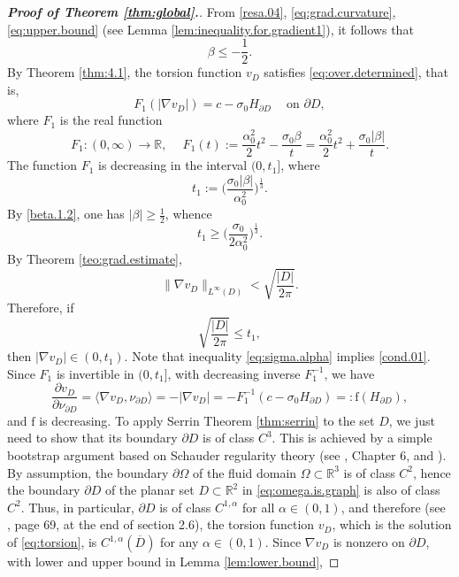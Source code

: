 \documentclass[10pt,reqno,a4paper]{article}
\numberwithin{equation}{section}
\theoremstyle{plain}
\theoremstyle{definition}
\newcommand{\R}{{\mathbb R}}
\newcommand{\s}{\sigma}
\newcommand{\la}{\langle}
\newcommand{\ra}{\rangle}
\newcommand{\pa}{\partial}
\newcommand{\grad}{\nabla}
\begin{document}
\begin{proof}[\textbf{Proof of Theorem \ref{thm:global}.}]
From \eqref{resa.04}, \eqref{eq:grad.curvature}, \eqref{eq:upper.bound} 
(see Lemma \ref{lem:inequality.for.gradient1}), 
it follows that 
\begin{equation} \label{beta.1.2}
\beta \leq -\frac12.
\end{equation}
By Theorem \ref{thm:4.1}, the torsion function $v_D$ satisfies \eqref{eq:over.determined}, that is, 
\[
F_1(|\nabla v_D|) = c - \s_0 H_{\pa D} \quad \ \text{on } \pa D,
\]
where $F_1$ is the real function 
\[ 
F_1 : (0, \infty) \to \R, \quad \ 
F_1(t) := \frac{\alpha_0^2}{2} t^2 -\frac{\sigma_0\beta}{t} 
= \frac{\alpha_0^2}{2} t^2 + \frac{\sigma_0 |\beta|}{t}.
\]
The function $F_1$ is decreasing in the interval $(0, t_1]$, where 
\[
t_1 := \Big( \frac{\sigma_0 |\beta|}{\alpha_0^2} \Big)^{\frac13}.
\]
By \eqref{beta.1.2}, one has $|\beta| \geq \frac12$, whence
\[
t_1 \geq \Big( \frac{\sigma_0}{2\alpha_0^2} \Big)^{\frac13}.
\]
By Theorem \ref{teo:grad.estimate}, 
\[ 
\|\nabla v_D\|_{L^\infty(D)} < \sqrt{\frac{|D|}{2\pi}}.
\] 
Therefore, if 
\begin{equation} \label{cond.01}
\sqrt{\frac{|D|}{2\pi}} \leq t_1,
\end{equation}
then $|\nabla v_D| \in (0,t_1)$. 
Note that inequality \eqref{eq:sigma.alpha} implies \eqref{cond.01}. 
Since $F_1$ is invertible in $(0,t_1]$, 
with decreasing inverse $F_1^{-1}$, 
we have 
\begin{equation} \label{eq:non.increasing}
\frac{\pa v_D}{\pa \nu_{\pa D}} 
= \la \grad v_D , \nu_{\pa D} \ra 
= -|\nabla v_D|
= - F_1^{-1}(c-\sigma_0 H_{\pa D}) 
=: \mathrm f(H_{\pa D}),
\end{equation}
and $\mathrm f$ is decreasing.  
To apply Serrin Theorem \ref{thm:serrin} to the set $D$, 
we just need to show that its boundary $\pa D$ is of class $C^3$. 
This is achieved by a simple bootstrap argument based on Schauder regularity theory 
(see \cite{GT}, Chapter 6, and \cite{FR.Ros.Oton.2022}).
By assumption, the boundary $\pa \Omega$ of the fluid domain $\Omega \subset \R^3$ is of class $C^2$, 
hence the boundary $\pa D$ of the planar set $D \subset \R^2$ in \eqref{eq:omega.is.graph} is also of class $C^2$. 
Thus, in particular, $\pa D$ is of class $C^{1,\alpha}$ for all $\alpha \in (0,1)$, 
and therefore (see \cite{FR.Ros.Oton.2022}, page 69, at the end of section 2.6), 
the torsion function $v_D$, which is the solution of \eqref{eq:torsion},  
is $C^{1,\alpha}(\overline{D})$ for any $\alpha \in (0,1)$. 
Since $\nabla v_D$ is nonzero on $\pa D$, with lower and upper bound in Lemma \ref{lem:lower.bound}, 

\end{proof}
\end{document}
